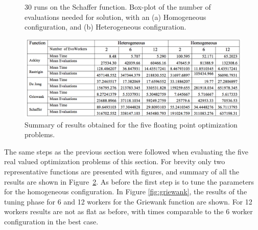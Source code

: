 \documentclass[graybox]{svmult}
\begin{document}
%
\begin{figure}[t]
    \centering


    \caption{30 runs on the Schaffer function. Box-plot of the number of evaluations needed for
      solution, with an (a) Homogeneous configuration, and (b) Heterogeneous configuration.}
    \label{fig:schaffer}
\end{figure}
%
\begin{figure}[t]
    \centering
        \includegraphics[width=4.5in]{img/table.png}
    \caption{Summary of results obtained for the five floating point
      optimization problems. }
    \label{fig:summary}
\end{figure}

The same steps as the previous section were followed when evaluating the five real valued
optimization problems of this section.  For brevity only two representative functions are
presented with figures, and summary of all the results are shown in Figure~\ref{fig:summary}. As before
the first step is to tune the parameters for the homogeneous configuration.
In Figure \ref{fig:griewank}, the results of the tuning phase for 6 and 12 workers
for the Griewank function are shown. For 12 workers results are not as flat as before,
with times comparable to the 6 worker configuration in the best case.
\end{document}
